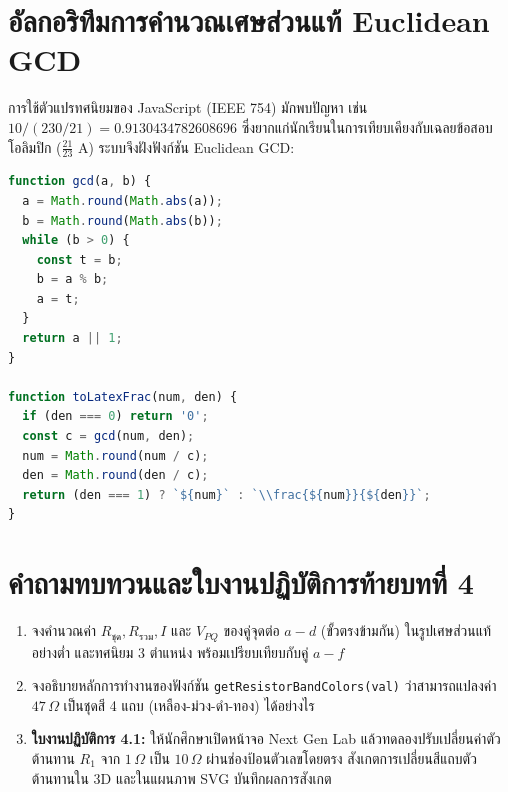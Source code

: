\section{อัลกอริทึมการคำนวณเศษส่วนแท้ Euclidean GCD}
การใช้ตัวแปรทศนิยมของ JavaScript (IEEE 754) มักพบปัญหา เช่น $10 / (230/21) = 0.9130434782608696$ ซึ่งยากแก่นักเรียนในการเทียบเคียงกับเฉลยข้อสอบโอลิมปิก ($\frac{21}{23}\text{ A}$) ระบบจึงฝังฟังก์ชัน Euclidean GCD:

\begin{lstlisting}[language=JavaScript, caption={ฟังก์ชัน Euclidean GCD และการจัดรูปเศษส่วนแท้ LaTeX}]
function gcd(a, b) {
  a = Math.round(Math.abs(a));
  b = Math.round(Math.abs(b));
  while (b > 0) {
    const t = b;
    b = a % b;
    a = t;
  }
  return a || 1;
}

function toLatexFrac(num, den) {
  if (den === 0) return '0';
  const c = gcd(num, den);
  num = Math.round(num / c);
  den = Math.round(den / c);
  return (den === 1) ? `${num}` : `\\frac{${num}}{${den}}`;
}
\end{lstlisting}

\section*{คำถามทบทวนและใบงานปฏิบัติการท้ายบทที่ 4}

\begin{enumerate}[leftmargin=1.5em, itemsep=8pt]
    \item จงคำนวณค่า $R_{\text{ชุด}}, R_{\text{รวม}}, I$ และ $V_{PQ}$ ของคู่จุดต่อ \textbf{$a-d$} (ขั้วตรงข้ามกัน) ในรูปเศษส่วนแท้อย่างต่ำ และทศนิยม 3 ตำแหน่ง พร้อมเปรียบเทียบกับคู่ $a-f$
    \item จงอธิบายหลักการทำงานของฟังก์ชัน \texttt{getResistorBandColors(val)} ว่าสามารถแปลงค่า $47\,\Omega$ เป็นชุดสี 4 แถบ (เหลือง-ม่วง-ดำ-ทอง) ได้อย่างไร
    \item \textbf{ใบงานปฏิบัติการ 4.1:} ให้นักศึกษาเปิดหน้าจอ Next Gen Lab แล้วทดลองปรับเปลี่ยนค่าตัวต้านทาน $R_1$ จาก $1\,\Omega$ เป็น $10\,\Omega$ ผ่านช่องป้อนตัวเลขโดยตรง สังเกตการเปลี่ยนสีแถบตัวต้านทานใน 3D และในแผนภาพ SVG บันทึกผลการสังเกต
\end{enumerate}
